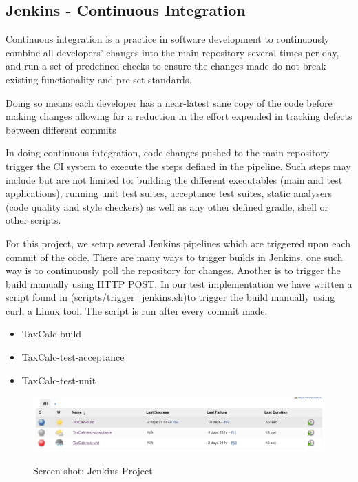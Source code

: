 \subsection{Jenkins - Continuous Integration}
Continuous integration is a practice in software development to continuously combine all developers’ changes into the main repository several times per day, and run a set of predefined checks to ensure the changes made do not break existing functionality and pre-set standards. 
\par
Doing so means each developer has a near-latest sane copy of the code before making changes allowing for a reduction in the effort expended in tracking defects between different commits  
\par
In doing continuous integration, code changes pushed to the main repository  trigger the CI system to execute the steps defined in the pipeline.
Such steps may include but are not limited to: building the different executables (main and test applications), running unit test suites, acceptance test suites, static analysers (code quality and style checkers) as well as any other defined gradle, shell or other scripts.  
\par
For this project, we setup several Jenkins pipelines which are triggered upon each commit of the code. There are many ways to trigger builds in Jenkins, one such way is to continuously poll the repository for changes. 
Another is to trigger the build manually using HTTP POST. In our test implementation we have written a script found in (scripts/trigger\_jenkins.sh)to trigger the build manually using curl, a Linux tool. The script is run after every commit made. 
\begin{itemize}
    \item TaxCalc-build
	\item TaxCalc-test-acceptance
	\item TaxCalc-test-unit
\end{itemize}

\begin{figure}[H]
\includegraphics[scale=0.4]{res/jenkins.png}
\label{fig:jenkins-screenshot}
\caption{Screen-shot: Jenkins Project}
\end{figure}